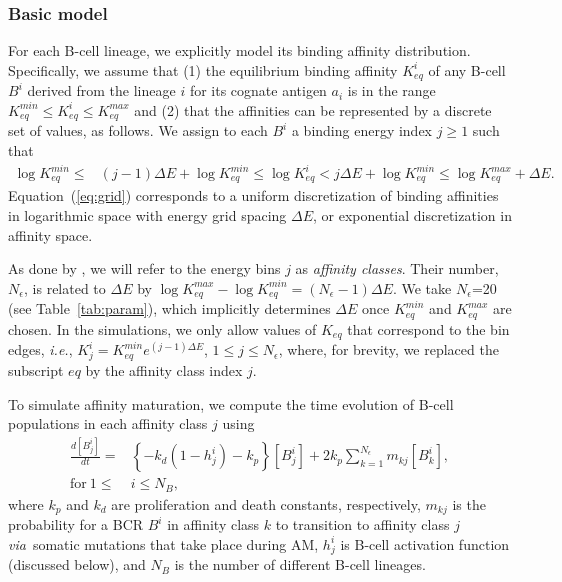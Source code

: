 \documentclass[utf8]{frontiersHLTH}%
\newcommand{\td}[2]{\frac{d {#1}}{d {#2}}}
\newcommand{\mk}[1]{} %
\newcommand{\comment}[1]{} %
\def\ie {{\it i.e.}}
\def\via {{\it via}}
\newcommand{\Eq}[1] {Equation~(\ref{eq:#1})}
\newcommand{\tab}[1]{Table~\ref{tab:#1}}
\begin{document}
\subsubsection{Basic model}
\label{sec:basic}
For each B-cell lineage, we explicitly
model its binding affinity distribution. Specifically, we
assume that (1) the equilibrium binding affinity $K_{eq}^i$ of any B-cell $B^i$ derived from the lineage $i$
for its cognate antigen $a_i$ is in the range $K_{eq}^{min}\le K_{eq}^i \le K_{eq}^{max}$ and (2) that the affinities
can be represented by a discrete set of values, as follows. We assign to each $B^i$ a binding energy index $j\ge1$ such that
\begin{equation}
 \begin{aligned}
 \log K^{min}_{eq}\le& (j-1)\Delta E+\log K^{min}_{eq}\le \log K_{eq}^i
               < j\Delta E + \log K^{min}_{eq}\le\log K^{max}_{eq} +\Delta E.
 \end{aligned}
 \label{eq:grid}
\end{equation}
\Eq{grid} corresponds to a uniform discretization of binding
affinities in logarithmic space with energy grid spacing $\Delta E$, or exponential
discretization in affinity space.

As done by \citet{kepler93}, we will refer to the energy bins $j$ as
\textit{affinity classes}. Their number, $N_\epsilon$, is related to $\Delta E$ by $\log K^{max}_{eq} - \log K^{min}_{eq} =
(N_\epsilon-1)\Delta E$. We take
$N_\epsilon$=20 (see \tab{param}), which implicitly determines $\Delta E$
once $K^{min}_{eq}$ and $K^{max}_{eq}$ are chosen. In the simulations, we only
allow values of $K_{eq}$ that correspond to the bin edges, \ie,
$K^i_j=K^{min}_{eq}e^{(j-1)\Delta E}$, $1\le j\le N_\epsilon$, where,
for brevity, we replaced the subscript $eq$ by the affinity class index $j$.

To simulate affinity maturation, we compute the time evolution of B-cell
populations in each affinity class $j$ using \mk{Should the second term in the
first brackets by ``$+k_p$''?}\comment{No, can compare with Kepler93 ref.}
\begin{equation}
\begin{aligned}
 \td{[B^i_j]}{t}=&\left\{-k_d(1-h^i_j) - k_p\right\}[B^i_j] + 2k_p\sum^{N_\epsilon}_{k=1} m_{kj} [B^i_k],\\
  \textrm{for}\ 1\le& i\le N_B,
\end{aligned}
 \label{eq:am}
\end{equation}
where $k_p$ and $k_d$ are proliferation and death constants, respectively, $m_{kj}$ is the probability
for a BCR $B^i$ in affinity class $k$ to transition to affinity class $j$ \via~somatic mutations that take place during AM,
$h^i_j$ is B-cell activation function (discussed below), and $N_B$ is the number of different B-cell lineages.
\end{document}
